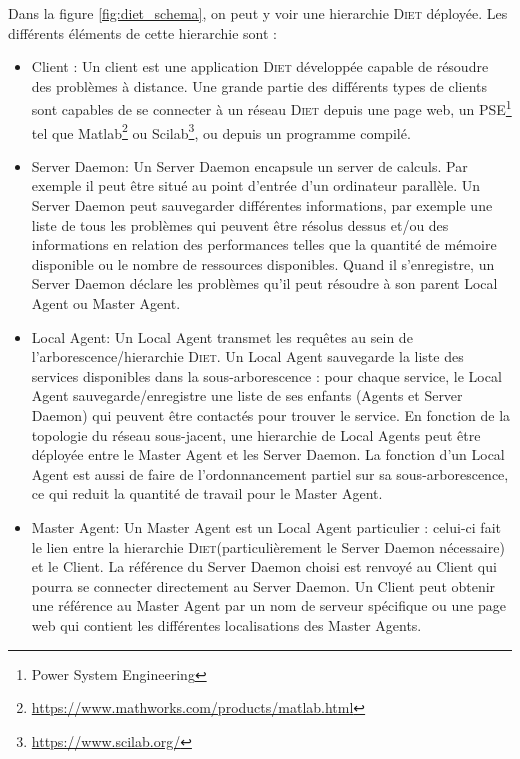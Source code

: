 \documentclass{article}
\newcommand{\diet}{\textsc{Diet}\xspace} %
\newcommand{\ma}{Master Agent\xspace}
\newcommand{\mas}{Master Agents\xspace}
\newcommand{\la}{Local Agent\xspace}
\newcommand{\las}{Local Agents\xspace}
\newcommand{\sed}{Server Daemon\xspace}
\begin{document}


Dans la figure \ref{fig:diet_schema}, on peut y voir une hierarchie \diet
déployée. Les différents éléments de cette hierarchie sont :
\begin{itemize}
	\item Client : Un client est une application \diet développée capable de
	résoudre des problèmes à distance. Une grande partie des différents types de
	clients sont capables de se connecter à un réseau \diet depuis une page web, un
	PSE\footnote{Power System Engineering} tel que Matlab\footnote{
	\url{https://www.mathworks.com/products/matlab.html}} ou Scilab\footnote{
	\url{https://www.scilab.org/}}, ou depuis un programme compilé.

	\item \sed : Un \sed encapsule un server de calculs. Par exemple il peut être
	situé au point d'entrée d'un ordinateur parallèle. Un \sed peut sauvegarder
	différentes informations, par exemple une liste de tous les problèmes qui
	peuvent être résolus dessus et/ou des informations en relation des
	performances telles que la quantité de mémoire disponible ou le nombre de
	ressources disponibles. Quand il s'enregistre, un \sed déclare les problèmes
	qu'il peut résoudre à son parent \la ou \ma.

	\item \la : Un \la transmet les requêtes au sein de l'arborescence/hierarchie
	\diet. Un \la sauvegarde la liste des services disponibles dans la
	sous-arborescence : pour chaque service, le \la sauvegarde/enregistre une
	liste de ses enfants (Agents et \sed) qui peuvent être contactés pour trouver
	le service. En fonction de la topologie du réseau sous-jacent, une hierarchie
	de \las peut être déployée entre le \ma et les \sed. La fonction d'un \la est
	aussi de faire de l'ordonnancement partiel sur sa sous-arborescence, ce qui
	reduit la quantité de travail pour le \ma.

	\item \ma : Un \ma est un \la particulier : celui-ci fait le lien entre la
	hierarchie \diet (particulièrement le \sed nécessaire) et le Client. La
	référence du \sed choisi est renvoyé au Client qui pourra se connecter
	directement au \sed. Un Client peut obtenir une référence au \ma par un nom
	de serveur spécifique ou une page web qui contient les différentes
	localisations des \mas.

\end{itemize}
\end{document}
